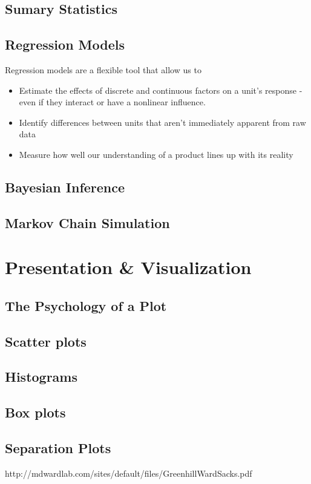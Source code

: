 \documentclass[11pt,a4paper,article]{memoir} %
\begin{document}
\subsection{Sumary Statistics}
\subsection{Regression Models}
Regression models are a flexible tool that allow us to
\begin{itemize}
\item Estimate the effects of discrete and continuous factors on a unit's response - even if they interact or have a nonlinear influence.
\item Identify differences between units that aren't immediately apparent from raw data
\item Measure how well our understanding of a product lines up with its reality
\end{itemize}
\subsection{Bayesian Inference}
\subsection{Markov Chain Simulation}

\section{Presentation \& Visualization}
\subsection{The Psychology of a Plot}
\subsection{Scatter plots}
\subsection{Histograms}
\subsection{Box plots}
\subsection{Separation Plots}
http://mdwardlab.com/sites/default/files/GreenhillWardSacks.pdf
\end{document}
